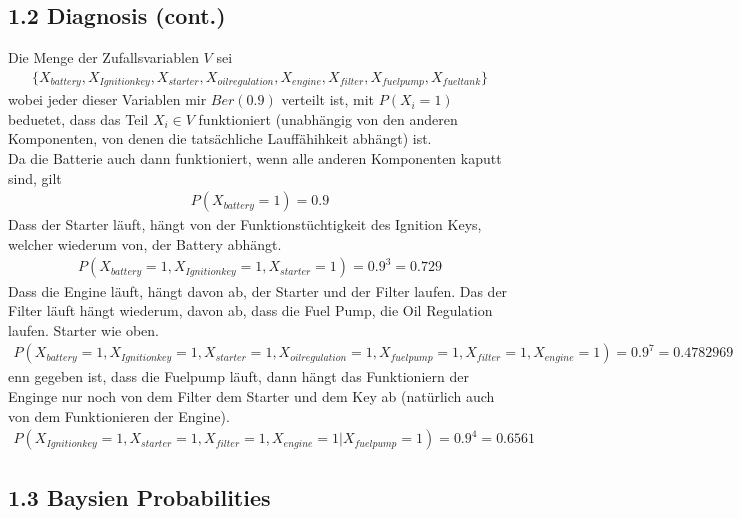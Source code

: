 \documentclass[a4paper,11pt,fleqn]{scrartcl}
\begin{document}
\subsection*{1.2 Diagnosis (cont.) }
Die Menge der Zufallsvariablen $V$ sei
\begin{align*}
  \{X_{battery},X_{Ignition key}, X_{starter},X_{oil regulation},X_{engine}, X_{filter}, X_{fuel pump}, X_{fuel tank}\}
\end{align*}
wobei jeder dieser Variablen mir $Ber(0.9)$ verteilt ist, mit $P(X_i=1)$ beduetet, dass das Teil $X_i \in V$ funktioniert (unabhängig von den anderen Komponenten, von denen die tatsächliche  Lauffähihkeit abhängt) ist.\\
Da die Batterie auch dann funktioniert, wenn alle anderen Komponenten kaputt sind, gilt
\begin{align*}
P(X_{battery} = 1) = 0.9
\end{align*}
Dass der Starter läuft, hängt von der Funktionstüchtigkeit des Ignition Keys, welcher wiederum von, der Battery abhängt.
\begin{align*}
P(X_{battery} = 1, X_{Ignition key} = 1, X_{starter} = 1) = 0.9^3 = 0.729
\end{align*}
Dass die Engine läuft, hängt davon ab, der Starter und der Filter laufen. Das der Filter läuft hängt wiederum, davon ab, dass die Fuel Pump, die Oil Regulation laufen. Starter wie oben.
\begin{align*}
P(X_{battery} = 1, X_{Ignition key} = 1, X_{starter} = 1, X_{oil regulation} = 1, X_{fuel pump} = 1, X_{filter} = 1, X_{engine} = 1)  = 0.9^7 = 0.4782969
\end{align*} 
enn gegeben ist, dass die Fuelpump läuft, dann hängt das Funktioniern der Enginge nur noch von dem Filter dem Starter und dem Key ab (natürlich auch von dem Funktionieren der Engine).
\begin{align*}
P(X_{Ignition key} = 1, X_{starter} = 1, X_{filter} = 1, X_{engine} = 1 \vert X_{fuel pump} = 1 )  = 0.9^4 = 0.6561 
\end{align*} 
\subsection*{1.3 Baysien Probabilities}
\end{document}
